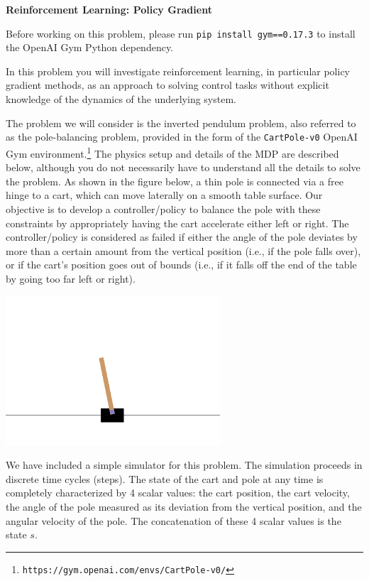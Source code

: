 \item {} {\bf Reinforcement Learning: Policy Gradient}

Before working on this problem, please run \texttt{pip install gym==0.17.3} to install the OpenAI Gym Python dependency.

In this problem you will investigate reinforcement learning, in particular policy gradient methods, as an approach to solving control tasks without explicit knowledge of the dynamics of the underlying system.

The problem we will consider is the inverted pendulum problem, also referred to as the pole-balancing problem, provided in the form of the {\tt CartPole-v0} OpenAI Gym environment.\footnote{{\tt https://gym.openai.com/envs/CartPole-v0/}} 
The physics setup and details of the MDP are described below, although you do not necessarily have to understand all the details to solve the problem. 
As shown in the figure below, a thin pole is connected via a free hinge to a cart, which can move laterally on a smooth table surface. 
Our objective is to develop a controller/policy to balance the pole with these  constraints by appropriately having the cart accelerate either left or right. The controller/policy is considered as failed if either the angle of the pole deviates by more than a certain amount from the vertical position (i.e., if the pole falls over), or if the cart's position goes out of bounds (i.e., if it falls off the end of the table by going too far left or right). 

\begin{center}
  \includegraphics[width=8cm]{policy_gradient/env.png}
\end{center}

We have included a simple simulator for this problem. The simulation proceeds in discrete time cycles (steps). The state of the cart and pole at any time is completely characterized by 4 scalar values: the cart position, the cart velocity, the angle of the pole measured as its deviation from the vertical position, and the angular velocity of the pole. The concatenation of these 4 scalar values is the state $s$. 

